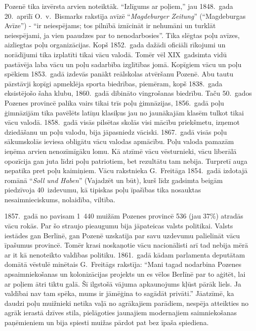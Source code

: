 \documentclass[twoside,a5paper,12pt,fleqn,openany]{extbook}
\newcommand{\detxti}[1]{\textit{\textgerman{#1}}}
\begin{document}
 Pozenē tika izvērsta arvien noteiktāk. ``Izlīgums ar poļiem,'' jau 1848.~gada 20.~aprīlī O.~v.~Bismarks rakstīja avīzē ``\detxti{Magdeburger Zeitung}'' (``Magdeburgas Avīze'') - ``ir neiespējams; tos pilnībā iznīcināt ir nehumāni un turklāt neiespējami, ja vien paaudzes par to nenodarbosies''. Tika slēgtas poļu avīzes, aizliegtas poļu organizācijas. Kopš 1852.~gada dažādi oficiāli rīkojumi un norādījumi tika izplatīti tikai vācu valodā. Tomēr vēl XIX~gadsimta vidū pastāvēja laba vācu un poļu sadarbība izglītības jomā. Kopīgiem vācu un poļu spēkiem 1853.~gadā izdevās panākt reālskolas atvēršanu Pozenē. Abu tautu pārstāvji kopīgi apmeklēja sporta biedrības, piemēram, kopš 1838.~gada eksistējošo šaha klubu, 1860.~gadā dibināto vingrošanas biedrību. Taču 50.~gados Pozenes provincē palika vairs tikai trīs poļu ģimnāzijas, 1856.~gadā poļu ģimnāzijām tika pavēlēts latīņu klasiķus jau no jaunākajām klasēm tulkot tikai vācu valodā. 1858.~gadā visās pilsētas skolās visi mācību priekšmetu, izņemot dziedāšanu un poļu valodu, bija jāpasniedz vāciski. 1867.~gadā visās poļu sākumskolās ieviesa obligātu vācu valodas apmācību. Poļu valoda pamazām ieņēma arvien nenozīmīgāku lomu. Kā atzīmē vācu vēsturnieki, vācu liberālā opozīcija gan juta līdzi poļu patriotiem, bet rezultātu tam nebija. Turpretī auga nepatika pret poļu kaimiņiem. Vācu rakstnieka G.~Freitāga 1854.~gadā izdotajā romānā ``\detxti{Soll und Haben}'' (Vajadzēt un būt), kurš līdz gadsimta beigām piedzīvoja 40~izdevumu, kā tipiskas poļu īpašības tika nosauktas nesaimnieciskums, nolaidība, viltība.

1857.~gadā no pavisam 1~440 muižām Pozenes provincē 536 (jau 37\%) atradās vācu rokās. Par šo straujo pieaugumu bija jāpateicas valsts politikai. Valsts iestādes gan Berlīnē, gan Pozenē uzskatīja par savu uzdevumu palielināt vācu īpašumus provincē. Tomēr krasi noskaņotie vācu nacionālisti arī tad nebija mērā ar it kā nenoteikto valdības politiku. 1861.~gadā kādam parlamenta deputātam domātā vēstulē minētais G.~Freitāgs rakstīja: ``Mani tagad nodarbina Pozenes apsaimniekošanas un kolonizācijas projekts un es vēlos Berlīnē par to aģitēt, lai ar poļiem ātri tiktu galā. Šī ilgstošā vājuma apkaunojums kļūst pārāk liels. Ja valdībai nav tam spēka, mums ir jāmēģina to sagādāt privāti.'' Jāatzīmē, ka daudzi poļu muižnieki netika vaļā no agrākajiem parādiem, nespēja atteikties no agrāk ierastā dzīves stila, pielāgoties jaunajiem modernajiem saimniekošanas paņēmieniem un bija spiesti muižas pārdot pat bez īpaša spiediena.
\end{document}
